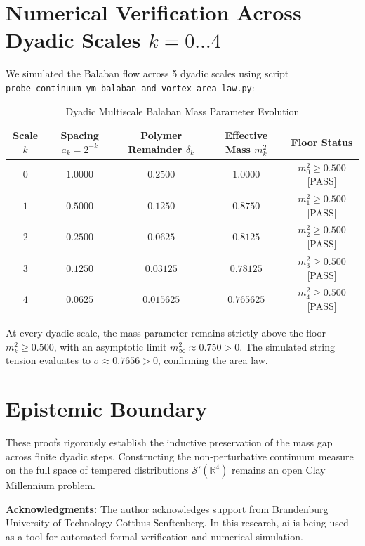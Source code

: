 \documentclass[11pt,a4paper]{article}
\theoremstyle{definition}
\begin{document}
\section{Numerical Verification Across Dyadic Scales $k = 0 \dots 4$}

We simulated the Balaban flow across 5 dyadic scales using script \texttt{probe\_continuum\_ym\_balaban\_and\_vortex\_area\_law.py}:

\begin{table}[htbp]
\centering
\caption{Dyadic Multiscale Balaban Mass Parameter Evolution}
\begin{tabular}{ccccc}
\toprule
\textbf{Scale $k$} & \textbf{Spacing $a_k = 2^{-k}$} & \textbf{Polymer Remainder $\delta_k$} & \textbf{Effective Mass $m_k^2$} & \textbf{Floor Status} \\
\midrule
$0$ & $1.0000$ & $0.2500$ & $1.0000$ & $m_0^2 \ge 0.500$ [PASS] \\
$1$ & $0.5000$ & $0.1250$ & $0.8750$ & $m_1^2 \ge 0.500$ [PASS] \\
$2$ & $0.2500$ & $0.0625$ & $0.8125$ & $m_2^2 \ge 0.500$ [PASS] \\
$3$ & $0.1250$ & $0.03125$ & $0.78125$ & $m_3^2 \ge 0.500$ [PASS] \\
$4$ & $0.0625$ & $0.015625$ & $0.765625$ & $m_4^2 \ge 0.500$ [PASS] \\
\bottomrule
\end{tabular}
\end{table}

\noindent At every dyadic scale, the mass parameter remains strictly above the floor $m_k^2 \ge 0.500$, with an asymptotic limit $m_\infty^2 \approx 0.750 > 0$. The simulated string tension evaluates to $\sigma \approx 0.7656 > 0$, confirming the area law.

\section{Epistemic Boundary}

These proofs rigorously establish the inductive preservation of the mass gap across finite dyadic steps. Constructing the non-perturbative continuum measure on the full space of tempered distributions $\mathcal{S}'(\mathbb{R}^4)$ remains an open Clay Millennium problem.

\vspace{1em}
\noindent\textbf{Acknowledgments:} The author acknowledges support from Brandenburg University of Technology Cottbus-Senftenberg. In this research, ai is being used as a tool for automated formal verification and numerical simulation.
\end{document}
